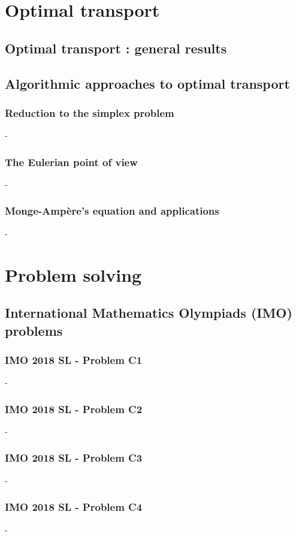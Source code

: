 \documentclass[12pt,openany,oneside]{book}
\theoremstyle{definition}
\numberwithin{definition}{section}
\numberwithin{theorem}{section}
\numberwithin{corollary}{section}
\numberwithin{proposition}{section}
\numberwithin{notation}{section}
\numberwithin{remark}{section}
\numberwithin{hypothesis}{section}
\numberwithin{example}{section}
\begin{document}
\part{Optimal transport}

\chapter{Optimal transport : general  results}

\chapter{Algorithmic approaches to optimal transport}

\section{Reduction to the simplex problem}-
\section{The Eulerian point of view}-
\section{Monge-Ampère's equation and applications}-

\part{Problem solving}

\chapter{International Mathematics Olympiads (IMO) problems}

\section{IMO 2018 SL - Problem C1}-
\section{IMO 2018 SL - Problem C2}-
\section{IMO 2018 SL - Problem C3}-
\section{IMO 2018 SL - Problem C4}-
\end{document}
